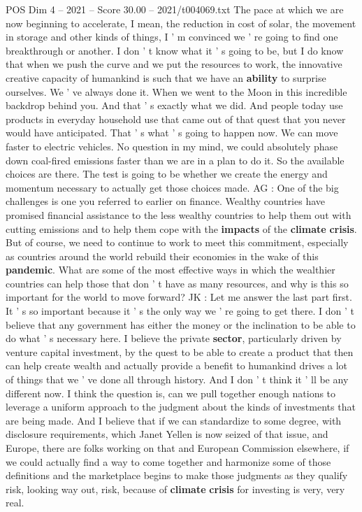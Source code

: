 \begin{textsample}{POS Dim 4 – 2021 – Score 30.00 – 2021/t004069.txt}
The pace at which we are now beginning to accelerate, I mean, the reduction in cost of solar, the movement in storage and other kinds of things, I ' m convinced we ' re going to find one breakthrough or another.
I don ' t know what it ' s going to be, but I do know that when we push the curve and we put the resources to work, the innovative creative capacity of humankind is such that we have an \textbf{ability} to surprise ourselves.
We ' ve always done it.
When we went to the Moon in this incredible backdrop behind you.
And that ' s exactly what we did.
And people today use products in everyday household use that came out of that quest that you never would have anticipated.
That ' s what ' s going to happen now.
We can move faster to electric vehicles.
No question in my mind, we could absolutely phase down coal-fired emissions faster than we are in a plan to do it.
So the available choices are there.
The test is going to be whether we create the energy and momentum necessary to actually get those choices made.
AG : One of the big challenges is one you referred to earlier on finance.
Wealthy countries have promised financial assistance to the less wealthy countries to help them out with cutting emissions and to help them cope with the \textbf{impacts} of the \textbf{climate} \textbf{crisis}.
But of course, we need to continue to work to meet this commitment, especially as countries around the world rebuild their economies in the wake of this \textbf{pandemic}.
What are some of the most effective ways in which the wealthier countries can help those that don ' t have as many resources, and why is this so important for the world to move forward?
JK : Let me answer the last part first.
It ' s so important because it ' s the only way we ' re going to get there.
I don ' t believe that any government has either the money or the inclination to be able to do what ' s necessary here.
I believe the private \textbf{sector}, particularly driven by venture capital investment, by the quest to be able to create a product that then can help create wealth and actually provide a benefit to humankind drives a lot of things that we ' ve done all through history.
And I don ' t think it ' ll be any different now.
I think the question is, can we pull together enough nations to leverage a uniform approach to the judgment about the kinds of investments that are being made.
And I believe that if we can standardize to some degree, with disclosure requirements, which Janet Yellen is now seized of that issue, and Europe, there are folks working on that and European Commission elsewhere, if we could actually find a way to come together and harmonize some of those definitions and the marketplace begins to make those judgments as they qualify risk, looking way out, risk, because of \textbf{climate} \textbf{crisis} for investing is very, very real.

\end{textsample}
